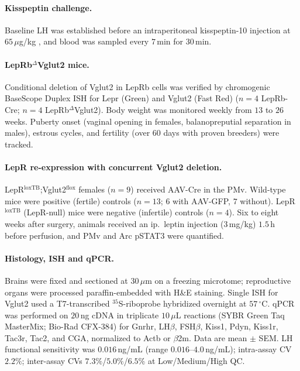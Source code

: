 \documentclass[11pt]{article}
\begin{document}
\paragraph{Kisspeptin challenge.} Baseline LH was established before an intraperitoneal kisspeptin-10 injection at $65\,\mu$g/kg \cite{wang2019kiss}, and blood was sampled every $7$\,min for $30$\,min.

\paragraph{LepRb$^{\Delta}$Vglut2 mice.} Conditional deletion of Vglut2 in LepRb cells was verified by chromogenic BaseScope Duplex ISH for Lepr (Green) and Vglut2 (Fast Red) ($n=4$ LepRb-Cre; $n=4$ LepRb$^{\Delta}$Vglut2). Body weight was monitored weekly from $13$ to $26$ weeks. Puberty onset (vaginal opening in females, balanopreputial separation in males), estrous cycles, and fertility (over $60$ days with proven breeders) were tracked.

\paragraph{LepR re-expression with concurrent Vglut2 deletion.} LepR$^{\mathrm{loxTB}}$;Vglut2$^{\mathrm{flox}}$ females ($n=9$) received AAV-Cre in the PMv. Wild-type mice were positive (fertile) controls ($n=13$; $6$ with AAV-GFP, $7$ without). LepR$^{\mathrm{loxTB}}$ (LepR-null) mice were negative (infertile) controls ($n=4$). Six to eight weeks after surgery, animals received an ip.\ leptin injection ($3$\,mg/kg) $1.5$\,h before perfusion, and PMv and Arc pSTAT3 were quantified.

\paragraph{Histology, ISH and qPCR.} Brains were fixed and sectioned at $30\,\mu$m on a freezing microtome; reproductive organs were processed paraffin-embedded with H\&E staining. Single ISH for Vglut2 used a T7-transcribed $^{35}$S-riboprobe hybridized overnight at $57\,^\circ$C. qPCR was performed on $20$\,ng cDNA in triplicate $10\,\mu$L reactions (SYBR Green Taq MasterMix; Bio-Rad CFX-384) for Gnrhr, LH$\beta$, FSH$\beta$, Kiss1, Pdyn, Kiss1r, Tac3r, Tac2, and CGA, normalized to Actb or $\beta$2m. Data are mean $\pm$ SEM. LH functional sensitivity was $0.016$\,ng/mL (range $0.016$--$4.0$\,ng/mL); intra-assay CV $2.2\%$; inter-assay CVs $7.3\%$/$5.0\%$/$6.5\%$ at Low/Medium/High QC.
\end{document}
